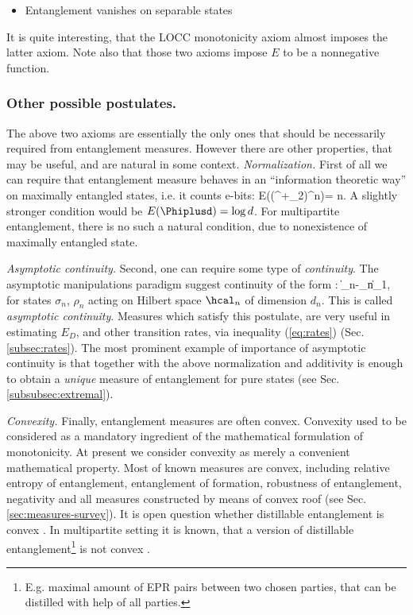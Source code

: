 \documentclass[rmp,12pt,preprint]{revtex4-2}
\begin{document}
\begin{itemize}
    \item  Entanglement vanishes on separable states
\end{itemize}


It is quite interesting, that the LOCC monotonicity axiom
almost imposes the latter axiom. Note also that those two axioms impose
$E$ to be a nonnegative function.



\subsubsection{Other  possible postulates.}
\label{sec:other-post}
The above two axioms are essentially the only
ones that should be necessarily required from entanglement measures. However there are other
properties, that may be useful, and are natural in some context.
{\it Normalization.}
First of all
we can require that entanglement  measure behaves in an ``information theoretic
way'' on maximally entangled states, i.e. it counts e-bits:
\be
E((\Phi^+_2)^{\ot n})= n.
\ee
A slightly stronger condition would be $E(\Phiplusd)=\log d$.
For multipartite entanglement, there is no such a natural condition,
due to nonexistence of maximally entangled state.

{\it Asymptotic continuity.}
Second, one can require some type of {\it continuity}. The asymptotic manipulations
paradigm suggest continuity of the form \cite{Vidal-mon2000,limits,DonaldHR2001}:
\be
\|\rho_n-\sigma_n\|_1\quad \Rightarrow {},
\ee
for states $\sigma_n$, $\rho_n$ acting on Hilbert space $\hcal_n$ of dimension $d_n$.
This is called {\it asymptotic continuity}. Measures which satisfy this postulate,
are very useful in estimating $E_D$, and other transition rates, via inequality
(\ref{eq:rates}) (Sec. \ref{subsec:rates}). The most prominent
example of importance of asymptotic continuity is that together with the above normalization and additivity is enough to obtain a {\it unique} measure
of entanglement for pure states (see Sec. \ref{subsubsec:extremal}).



{\it Convexity.}
Finally, entanglement measures are often convex. Convexity used to
be considered as a mandatory ingredient of the mathematical
formulation of monotonicity. At present we consider convexity as
merely a convenient mathematical property.
Most of known measures are convex, including relative entropy of
entanglement, entanglement of formation, robustness of entanglement,
negativity and  all measures constructed by means of convex
roof (see Sec. \ref{sec:measures-survey}). It is open question whether
distillable entanglement is convex \cite{ShorST2001}.
In multipartite setting it is known, that a version of distillable entanglement\footnote{E.g. maximal amount of EPR pairs between two chosen parties,
that can be distilled with help of all parties.} is not convex \cite{ShorST-superactiv}.
\end{document}
